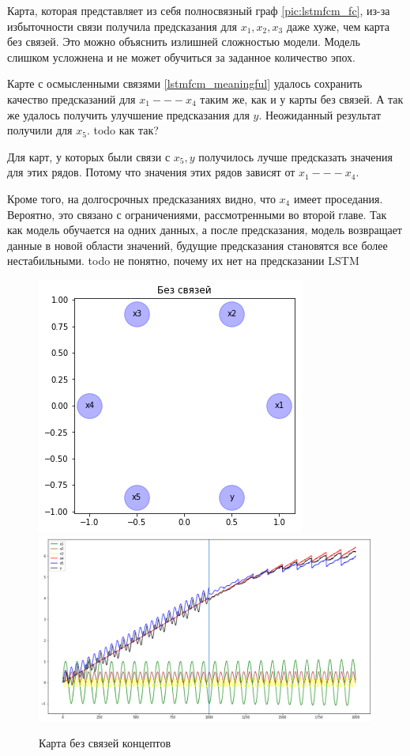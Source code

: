 Карта, которая представляет из себя полносвязный граф \ref{pic:lstmfcm_fc},
из-за избыточности связи получила предсказания для $ x_1, x_2, x_3 $ даже
хуже, чем карта без связей. Это можно объяснить излишней сложностью модели.
Модель слишком усложнена и не может обучиться за заданное количество эпох.

Карте с осмысленными связями \ref{lstmfcm_meaningful} удалось сохранить качество
предсказаний для $ x_1 --- x_4 $ таким же, как и у карты без связей.
А так же удалось получить улучшение предсказания для $ y $.
Неожиданный результат получили для $ x_5 $. todo как так?

Для карт, у которых были связи с $ x_5, y $ получилось лучше предсказать значения
для этих рядов. Потому что значения этих рядов зависят от $ x_1 --- x_4 $.

Кроме того, на долгосрочных предсказаниях видно, что $ x_4 $ имеет проседания.
Вероятно, это связано с ограничениями, рассмотренными во второй главе.
Так как модель обучается на одних данных, а после предсказания, модель возвращает
данные в новой области значений, будущие предсказания становятся все более нестабильными.
todo не понятно, почему их нет на предсказании LSTM

\def\figurename{Рис}
\begin{figure}
	\centering
	\includegraphics[width=0.7\columnwidth]{./img/lstmfcm_empty.png}
	\includegraphics[width=0.9\columnwidth]{./img/lstmfcm_empty_prediction.png}
	\caption{Карта без связей концептов}
	\label{pic:lstmfcm_empty}
\end{figure}

